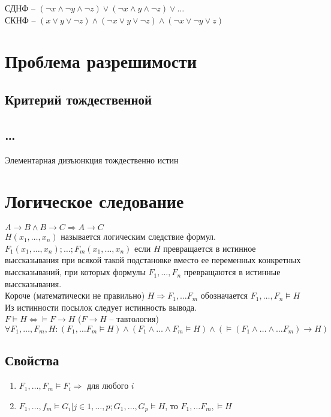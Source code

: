 \documentclass[letterpaper]{article}
\begin{document}
СДНФ -- \((\neg{x} \land \neg{y} \land \neg{z}) \lor (\neg{x} \land y \land \neg{z}) \lor \dots\)\\

СКНФ -- \((x \lor y \lor \neg{z}) \land (\neg{x} \lor y \lor \neg{z}) \land (\neg{x} \lor \neg{y} \lor z)\)\\
\section{Проблема разрешимости}
\label{sec:org0b66c27}
\subsection{Критерий тождественной}
\label{sec:org0f10193}

\subsection{\ldots{}}
\label{sec:orga6000c9}
Элементарная дизъюнкция тождественно истин\\
\section{Логическое следование}
\label{sec:orgacb21cd}
\(A \rightarrow B \land B \rightarrow C \Rightarrow A \rightarrow C\)\\

\(H(x_1, \dots, x_n)\) называется логическим следствие формул. \(F_1(x_1, \dots, x_n); \dots; F_m(x_1, \dots, x_n)\) если \(H\) превращается в истинное выссказывания при всякой такой подстановке вместо ее переменных конкретных выссказываний, при которых формулы \(F_1, \dots, F_n\) превращаются в истинные выссказывания.\\

Короче (математически не правильно) \(H \Rightarrow F_1, \dots F_m\) обозначается \(F_1, \dots, F_n \models H\)\\

Из истинности посылок следует истинность вывода.\\

\(F \models H \iff \models F \rightarrow H\) (\(F \rightarrow H\) -- тавтология)\\

\(\forall F_1, \dots, F_m, H : (F_1, \dots F_m \models H) \land (F_1 \land \dots \land F_m \models H) \land (\models (F_1 \land \dots \land \dots F_m ) \rightarrow H)\)\\
\subsection{Свойства}
\label{sec:org50f4c79}
\begin{enumerate}
\item \(F_1, \dots, F_m \models F_i \Rightarrow\) для любого \(i\)\\
\item \(F_1, \dots, f_m \models G_i | j \in 1,\dots,p; G_1, \dots, G_p \models H\), то \(F_1, \dots F_m, \models H\)\\
\end{enumerate}
\end{document}
